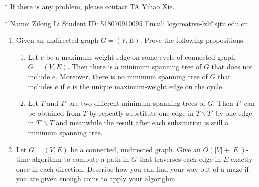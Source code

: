 \documentclass[12pt,a4paper]{article}
\theoremstyle{definition}
\begin{document}
\noindent

\noindent{}
\begin{center}
\footnotesize{\color{red}$*$ If there is any problem, please contact TA Yihao Xie. }

\footnotesize{\color{blue}$*$ Name: Zilong Li  \quad Student ID: 518070910095 \quad Email: logcreative-lzl@sjtu.edu.cn}
\end{center}

\begin{enumerate}

	\item Given an undirected graph $G = (V, E)$. Prove the following propositions.
	
	\begin{enumerate}
		\item Let $e$ be a maximum-weight edge on some cycle of connected graph $G=(V,E)$.
        Then there is a minimum spanning tree of $G$ that does not include $e$. Moreover, there is no minimum spanning tree of $G$ that includes $e$ if $e$ is the unique maximum-weight edge on the cycle. 
		\item Let $T$ and $T'$ are two different minimum spanning trees of $G$. Then $T'$ can be obtained from $T$ by repeatly substitute one edge in $T\backslash T'$ by one edge in $T'\backslash T$ and meanwhile the result after each subsitution is still a minimum spanning tree.
	\end{enumerate}
	
    \item Let $G=(V,E)$ be a connected, undirected graph. Give an $O(|V|+|E|)$-time algorithm
    to compute a path in $G$ that traverses each edge in $E$ exactly once in each direction. Describe how you can find your way out of a maze if you are given enough coins to apply your algorighm.


\end{enumerate}
\end{document}
